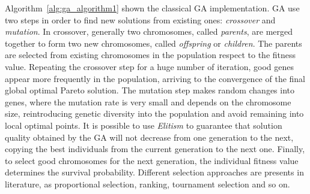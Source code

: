 %
Algorithm~\ref{alg:ga_algorithm1} shown the classical GA implementation. GA use two steps in order to find new solutions from existing ones: \textit{crossover} and \textit{mutation}. In crossover, generally two chromosomes, called \textit{parents}, are merged together to form two new chromosomes, called \textit{offspring} or \textit{children}. The parents are selected from existing chromosomes in the population respect to the fitness value. Repeating the crossover step for a huge number of iteration, good genes appear more frequently in the population, arriving to the convergence of the final global optimal Pareto solution. The mutation step makes random changes into genes, where the mutation rate is very small and depends on the chromosome size, reintroducing genetic diversity into the population and avoid remaining into local optimal points. It is possible to use \textit{Elitism} to guarantee that solution quality obtained by the GA will not decrease from one generation to the next, copying the best individuals from the current generation to the next one. 
Finally, to select good chromosomes for the next generation, the individual fitness value determines the survival probability. Different selection approaches are presents in literature, as proportional selection, ranking, tournament selection and so on. 
%
%
%
